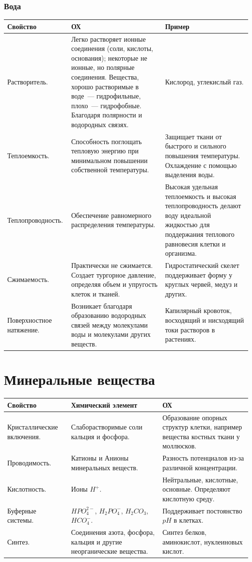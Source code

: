 \documentclass[12pt]{article}
\begin{document}
	\subsubsection{Вода}
	\begin{xltabular}{\textwidth}{|m{3.5cm}|X|X|}
		\hline
		Свойство & ОХ & Пример\\
		\hline
		Растворитель. & Легко растворяет ионные соединения (соли, кислоты, основания); некоторые не ионные, но полярные соединения. Вещества, хорошо растворимые в воде~--- гидрофильные, плохо~--- гидрофобные. Благодаря полярности и водородных связях. & Кислород, углекислый газ.\\
		\hline
		Теплоемкость. & Способность поглощать тепловую энергию при минимальном повышении собственной температуры. & Защищает ткани от быстрого и сильного повышения температуры. Охлаждение с помощью выделения воды.\\
		\hline
		Теплопроводность. & Обеспечение равномерного распределения температуры. & Высокая удельная теплоемкость и высокая теплопроводность делают воду идеальной жидкостью для поддержания теплового равновесия клетки и организма.\\
		\hline
		Сжимаемость. & Практически не сжимается. Создает тургорное давление, определяя объем и упругость клеток и тканей. & Гидростатический скелет поддерживает форму у круглых червей, медуз и других.\\
		\hline
		Поверхностное натяжение. & Возникает благодаря образованию водородных связей между молекулами воды и молекулами других веществ. & Капилярный кровоток, восходящий и нисходящий токи растворов в растениях.\\
		\hline
	\end{xltabular}
	\section{Минеральные вещества}
	\begin{xltabular}{\textwidth}{|X|X|X|}
		\hline
		Свойство & Химический элемент & ОХ\\
		\hline
		Кристаллические включения. & Слаборастворимые соли кальция и фосфора. & Образование опорных структур клетки, например вещества костных ткани у моллюсков.\\
		\hline
		Проводимость. & Катионы и Анионы минеральных веществ. & Разность потенциалов из-за различной концентрации.\\
		\hline
		Кислотность. & Ионы $H^+$. & Нейтральные, кислотные, основные. Определяют кислотную среду.\\
		\hline
		Буферные системы. & $HPO_4^{2-}$, $H_2PO_4^-$, $H_2CO_3$, $HCO_4^-$. & Поддерживает постоянство $pH$ в клетках.\\
		\hline
		Синтез. & Соединения азота, фосфора, кальция и другие неорганические вещества. & Синтез белков, аминокислот, нуклеиновых кислот.\\
		\hline
	\end{xltabular}
\end{document}
